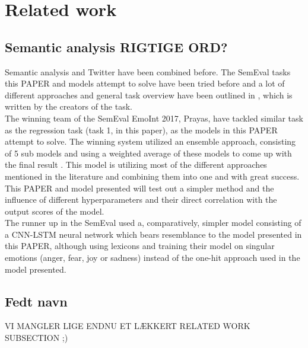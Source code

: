 
\section{Related work}

\subsection{Semantic analysis RIGTIGE ORD?}

Semantic analysis and Twitter have been combined before. The SemEval tasks this PAPER and models attempt to solve have been tried before and a lot of different approaches and general task overview have been outlined in \cite{wassa2017}, which is written by the creators of the task.\\
The winning team of the SemEval EmoInt 2017, Prayas, have tackled similar task as the regression task (task 1, in this paper), as the models in this PAPER attempt to solve. The winning system utilized an ensemble approach, consisting of 5 sub models and using a weighted average of these models to come up with the final result \cite{prayas}. This model is utilizing most of the different approaches mentioned in the literature and combining them into one and with great success. This PAPER and model presented will test out a simpler method and the influence of different hyperparameters and their direct correlation with the output scores of the model.\\
The runner up in the SemEval used a, comparatively, simpler model consisting of a CNN-LSTM neural network which bears resemblance to the model presented in this PAPER, although using lexicons and training their model on singular emotions (anger, fear, joy or sadness) instead of the one-hit approach used in the model presented.\\

\subsection{Fedt navn}

VI MANGLER LIGE ENDNU ET LÆKKERT RELATED WORK SUBSECTION ;)